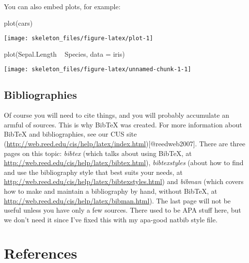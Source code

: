 \documentclass[12pt,twoside]{reedthesis}
\begin{document}
  You can also embed plots, for example:
  
  \begin{CodeChunk}
  \begin{CodeInput}
  plot(cars)
  \end{CodeInput}
  
  
  \begin{center}\texttt{[image: skeleton\_files/figure-latex/plot-1]} \end{center}
  
  \end{CodeChunk}
  
  \begin{CodeChunk}
  \begin{CodeInput}
  plot(Sepal.Length ~ Species, data = iris)
  \end{CodeInput}
  
  
  \begin{center}\texttt{[image: skeleton\_files/figure-latex/unnamed-chunk-1-1]} \end{center}
  
  \end{CodeChunk}
  
  \section{Bibliographies}
  
  Of course you will need to cite things, and you will probably accumulate
  an armful of sources. This is why BibTeX was created. For more
  information about BibTeX and bibliographies, see our CUS site
  (\url{http://web.reed.edu/cis/help/latex/index.html}){[}@reedweb2007{]}.
  There are three pages on this topic: \emph{bibtex} (which talks about
  using BibTeX, at \url{http://web.reed.edu/cis/help/latex/bibtex.html}),
  \emph{bibtexstyles} (about how to find and use the bibliography style
  that best suits your needs, at
  \url{http://web.reed.edu/cis/help/latex/bibtexstyles.html}) and
  \emph{bibman} (which covers how to make and maintain a bibliography by
  hand, without BibTeX, at
  \url{http://web.reed.edu/cis/help/latex/bibman.html}). The last page
  will not be useful unless you have only a few sources. There used to be
  APA stuff here, but we don't need it since I've fixed this with my
  apa-good natbib style file.
  
  \backmatter
  
  \setlength{\parindent}{0cm} \setlength{\parskip}{\medskipamount}
  
  \setlength{\bibhang}{5em}
  
  \chapter{References}

\end{document}
